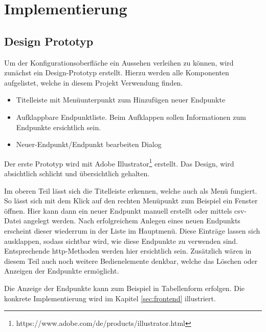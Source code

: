 \chapter{Implementierung} \label{chp:implementation}

\section{Design Prototyp}
Um der Konfigurationsoberfläche ein Aussehen verleihen zu können, wird zunächst ein Design-Prototyp erstellt. Hierzu werden alle Komponenten aufgelistet, welche in diesem Projekt Verwendung finden.

\begin{itemize}
    \item Titelleiste mit Menüunterpunkt zum Hinzufügen neuer Endpunkte
    \item Aufklappbare Endpunktliste. Beim Aufklappen sollen Informationen zum Endpunkte ersichtlich sein.
    \item Neuer-Endpunkt/Endpunkt bearbeiten Dialog
\end{itemize}

Der erste Prototyp wird mit Adobe Illustrator\footnote{https://www.adobe.com/de/products/illustrator.html} erstellt. Das Design, wird absichtlich schlicht und übersichtlich gehalten.

Im oberen Teil lässt sich die Titelleiste erkennen, welche auch als Menü fungiert. So lässt sich mit dem Klick auf den rechten Menüpunkt zum Beispiel ein Fenster öffnen. Hier kann dann ein neuer Endpunkt manuell erstellt oder mittels \gls{csv}-Datei angelegt werden. Nach erfolgreichem Anlegen eines neuen Endpunkts erscheint dieser wiederrum in der Liste im Hauptmenü. Diese Einträge lassen sich ausklappen, sodass sichtbar wird, wie diese Endpunkte zu verwenden sind. Entsprechende \gls{http}-Methoden werden hier ersichtlich sein. Zusätzlich wären in diesem Teil auch noch weitere Bedienelemente denkbar, welche das Löschen oder Anzeigen der Endpunkte ermöglicht.

Die Anzeige der Endpunkte kann zum Beispiel in Tabellenform erfolgen. Die konkrete Implementierung wird im Kapitel \ref{sec:frontend} illustriert.

